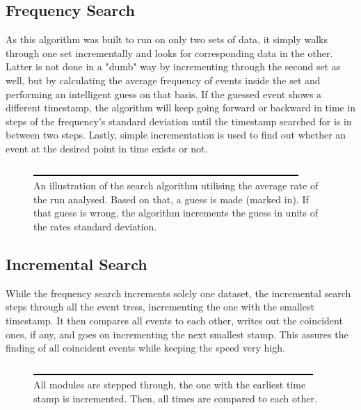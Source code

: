       \subsection{Frequency Search}
      \label{ch:Analysis software:sec:Search algorithms:subsec:Frequency Search}
      As this algorithm was built to run on only two sets of data, it simply walks through one set incrementally and looks for corresponding data in the other. Latter is not done in a "dumb" way by incrementing through the second set as well, but by calculating the average frequency of events inside the set and performing an intelligent guess on that basis. If the guessed event shows a different timestamp, the algorithm will keep going forward or backward in time in steps of the frequency's standard deviation until the timestamp searched for is in between two steps. Lastly, simple incrementation is used to find out whether an event at the desired point in time exists or not.
      \begin{figure}
	\centering
      	\includegraphics[width = 0.9\textwidth]{graphics/frequencySearch.eps}
      	\caption[Frequency search algorithm]{An illustration of the search algorithm utilising the average rate of the run analysed. Based on that, a guess is made (marked in). If that guess is wrong, the algorithm increments the guess in units of the rates standard deviation.}
      \end{figure}
      \subsection{Incremental Search}
      \label{ch:Analysis software:sec:Search algorithms:subsec: Incremental Search}
      While the frequency search increments solely one dataset, the incremental search steps through all the event tress, incrementing the one with the smallest timestamp. It then compares all events to each other, writes out the coincident ones, if any, and goes on incrementing the next smallest stamp. This assures the finding of all coincident events while keeping the speed very high.
      \begin{figure}
	\centering
      	\includegraphics[width = 0.9 \textwidth]{graphics/incrementalSearch.eps}
      	\caption[Incremental search algorithm]{All modules are stepped through, the one with the earliest time stamp is incremented. Then, all times are compared to each other.}
      \end{figure} 
